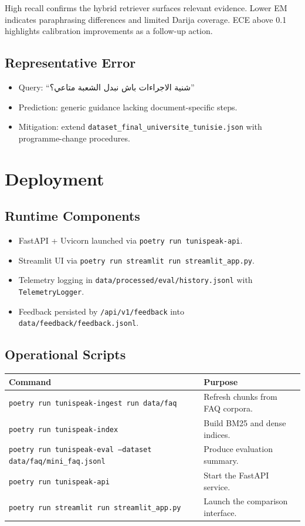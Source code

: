 \documentclass[12pt]{article}
\begin{document}
High recall confirms the hybrid retriever surfaces relevant evidence. Lower EM indicates paraphrasing differences and limited Darija coverage. ECE above 0.1 highlights calibration improvements as a follow-up action.

\subsection{Representative Error}
\begin{itemize}
    \item Query: ``شنية الاجراءات باش نبدل الشعبة متاعي؟''
    \item Prediction: generic guidance lacking document-specific steps.
    \item Mitigation: extend \texttt{dataset\_final\_universite\_tunisie.json} with programme-change procedures.
\end{itemize}

\section{Deployment}
\subsection{Runtime Components}
\begin{itemize}
    \item FastAPI + Uvicorn launched via \texttt{poetry run tunispeak-api}.
    \item Streamlit UI via \texttt{poetry run streamlit run streamlit\_app.py}.
    \item Telemetry logging in \texttt{data/processed/eval/history.jsonl} with \texttt{TelemetryLogger}.
    \item Feedback persisted by \texttt{/api/v1/feedback} into \texttt{data/feedback/feedback.jsonl}.
\end{itemize}

\subsection{Operational Scripts}
\begin{longtable}{>{\raggedright\arraybackslash}p{4cm} >{\raggedright\arraybackslash}p{10cm}}
\toprule
Command & Purpose \\
\midrule
\texttt{poetry run tunispeak-ingest run data/faq} & Refresh chunks from FAQ corpora. \\
\texttt{poetry run tunispeak-index} & Build BM25 and dense indices. \\
\texttt{poetry run tunispeak-eval --dataset data/faq/mini\_faq.jsonl} & Produce evaluation summary. \\
\texttt{poetry run tunispeak-api} & Start the FastAPI service. \\
\texttt{poetry run streamlit run streamlit\_app.py} & Launch the comparison interface. \\
\bottomrule
\end{longtable}
\end{document}
